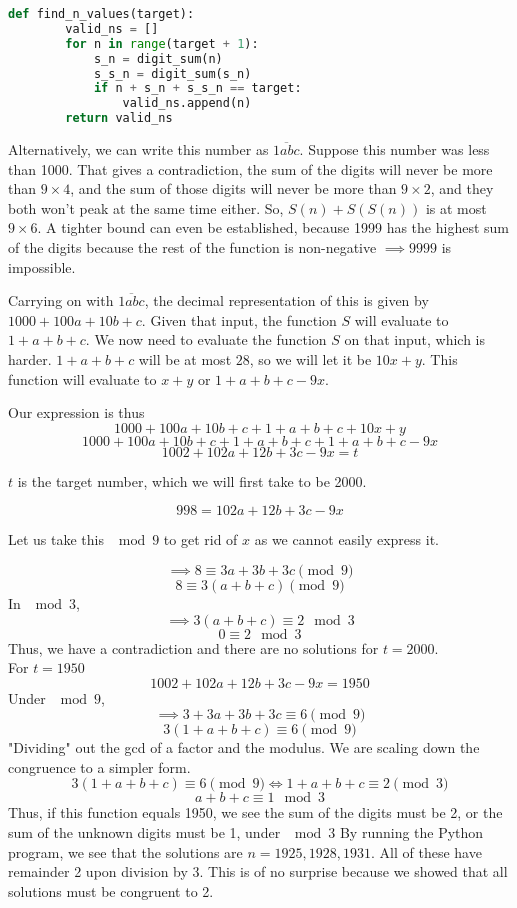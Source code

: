 \documentclass{article}
\begin{document}
\begin{enumerate}
\begin{lstlisting}[language=Python]
    def find_n_values(target):
        valid_ns = []
        for n in range(target + 1):  
            s_n = digit_sum(n)
            s_s_n = digit_sum(s_n)
            if n + s_n + s_s_n == target:
                valid_ns.append(n)
        return valid_ns
    \end{lstlisting}
    Alternatively, we can write this number as $\overline{1abc}$. Suppose this number was less than 1000. That gives a contradiction, the sum of the digits will never be more than $9\times4$, and the sum of those digits will never be more than $9\times2$, and they both won't peak at the same time either. So, $S(n) + S(S(n))$ is at most $9\times6$. A tighter bound can even be established, because 1999 has the highest sum of the digits because the rest of the function is non-negative $\implies 9999$ is impossible.

    Carrying on with $\overline{1abc}$, the decimal representation of this is given by $1000+100a+10b+c$. Given that input, the function $S$ will evaluate to $1+a+b+c$. We now need to evaluate the function $S$ on that input, which is harder. $1+a+b+c$ will be at most $28$, so we will let it be $10x+y$. This function will evaluate to $x+y$ or $1+a+b+c-9x$.

    Our expression is thus $$1000+100a+10b+c+1+a+b+c+10x+y$$
    $$1000+100a+10b+c+1+a+b+c+1+a+b+c-9x$$
    $$1002+102a+12b+3c-9x = t$$
    
    $t$ is the target number, which we will first take to be 2000.
    
    $$998 = 102a+12b+3c-9x$$

    Let us take this $\mod{9}$ to get rid of $x$ as we cannot easily express it.

    $$\implies 8 \equiv 3a+3b+3c \pmod{9}$$
    $$8 \equiv 3(a+b+c) \pmod{9}$$
    In $\mod{3}$,
    $$\implies 3(a + b + c) \equiv 2 \mod 3  $$
    $$ 0 \equiv 2 \mod3$$
    Thus, we have a contradiction and there are no solutions for $t=2000$.
    \\
    
    For $t=1950$
    $$1002+102a+12b+3c-9x = 1950$$
    Under $\mod{9}$,
    $$\implies 3+3a+3b+3c \equiv 6 \pmod{9}$$
    $$3(1+a+b+c) \equiv 6 \pmod{9}$$
    "Dividing" out the gcd of a factor and the modulus. We are scaling down the congruence to a simpler form.
    $$3(1+a+b+c) \equiv 6 \pmod{9} \iff 1+a+b+c \equiv 2 \pmod{3}$$
    $$a+b+c \equiv 1 \mod{3}$$
    Thus, if this function equals 1950, we see the sum of the digits must be 2, or the sum of the unknown digits must be 1, under $\mod{3}$
    By running the Python program, we see that the solutions are $n = 1925, 1928, 1931$. All of these have remainder 2 upon division by $3$. This is of no surprise because we showed that all solutions must be congruent to 2. 
    

\end{enumerate}
\end{document}
